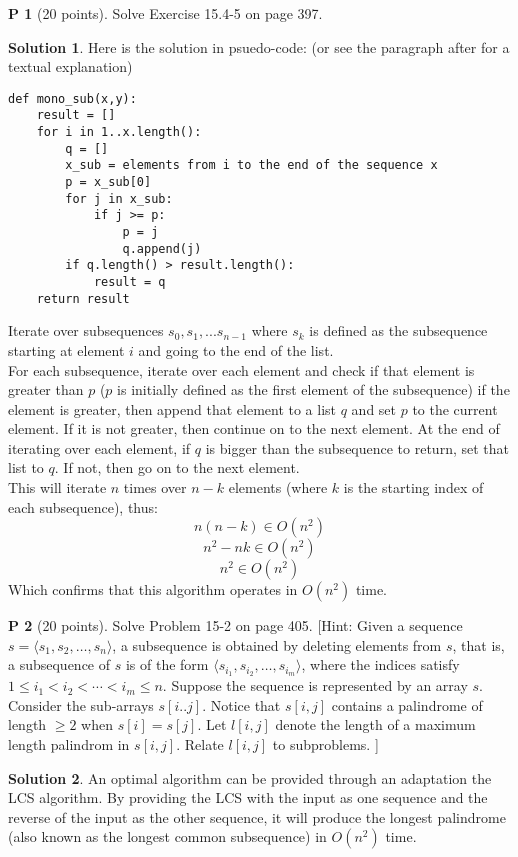 \documentclass{article}
\theoremstyle{definition}
\newtheorem{problem}{P}
\newtheorem*{solution}{Solution}
\begin{document}
\begin{problem}[20 points]
Solve Exercise 15.4-5 on page 397. 
\end{problem}
\begin{solution} Here is the solution in psuedo-code: (or see the paragraph after for a textual explanation)\\
\begin{verbatim}
def mono_sub(x,y):
    result = []
    for i in 1..x.length():
        q = []
        x_sub = elements from i to the end of the sequence x
        p = x_sub[0]
        for j in x_sub:
            if j >= p:
                p = j
                q.append(j)
        if q.length() > result.length():
            result = q
    return result 
\end{verbatim}

Iterate over subsequences $s_0,s_1,...s_{n-1}$ where $s_k$ is defined as the subsequence starting at element $i$ and going to the end of the list.\\
For each subsequence, iterate over each element and check if that element is greater than $p$ ($p$ is initially defined as the first element of the subsequence) if the element is greater, then append that element to a list $q$ and set $p$ to the current element. If it is not greater, then continue on to the next element. At the end of iterating over each element, if $q$ is bigger than the subsequence to return, set that list to $q$. If not, then go on to the next element.\\
This will iterate $n$ times over $n-k$ elements (where $k$ is the starting index of each subsequence), thus:
$$ n(n-k) \in O(n^2) $$
$$ n^2-nk \in O(n^2) $$
$$ n^2 \in O(n^2) $$
Which confirms that this algorithm operates in $O(n^2)$ time.
\end{solution}

\begin{problem}[20 points]
Solve Problem 15-2 on page 405. [Hint: Given a sequence $s= \langle s_1,
s_2, \ldots, s_n\rangle$, a subsequence is obtained by deleting
elements from $s$, that is, a subsequence of $s$ is of the form 
$ \langle s_{i_{1}}, s_{i_2}, \ldots, s_{i_m}\rangle$,
where the indices satisfy $1\le i_{1} < i_{2} < \cdots < i_{m} \le n$.  
Suppose the sequence is represented by an array $s$. 
Consider the
sub-arrays $s[i..j]$. Notice that $s[i,j]$ contains a palindrome of
length $\ge 2$ when $s[i]=s[j]$. Let $l[i,j]$ denote the length of a
maximum length palindrom in $s[i,j]$. Relate $l[i,j]$ to subproblems. ] 
\end{problem}
\begin{solution}
An optimal algorithm can be provided through an adaptation the LCS algorithm. By providing the LCS with the input as one sequence and the reverse of the input as the other sequence, it will produce the longest palindrome (also known as the longest common subsequence) in $O(n^2)$ time.
\end{solution}
\end{document}
